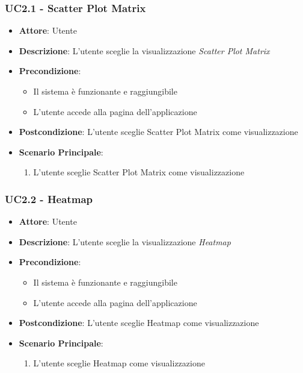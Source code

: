     \subsubsection{UC2.1 - Scatter Plot Matrix}
    \label{uc2.1}
    
    \begin{itemize}
    \item \textbf{Attore}: Utente
    \item \textbf{Descrizione}: L'utente sceglie la visualizzazione \emph{Scatter Plot Matrix}
    \item \textbf{Precondizione}:
    \begin{itemize}
        \item Il sistema è funzionante e raggiungibile
        \item L'utente accede alla pagina dell'applicazione
    \end{itemize}
    \item \textbf{Postcondizione}: L'utente sceglie Scatter Plot Matrix come visualizzazione
    \item \textbf{Scenario Principale}: 
        \begin{enumerate}
            \item L'utente sceglie Scatter Plot Matrix come visualizzazione
        \end{enumerate}
    \end{itemize}
    
    \subsubsection{UC2.2 - Heatmap}
    \label{uc2.2}
    
    \begin{itemize}
    \item \textbf{Attore}: Utente
    \item \textbf{Descrizione}: L'utente sceglie la visualizzazione \emph{Heatmap}
    \item \textbf{Precondizione}:
    \begin{itemize}
        \item Il sistema è funzionante e raggiungibile
        \item L'utente accede alla pagina dell'applicazione
    \end{itemize}
    \item \textbf{Postcondizione}: L'utente sceglie Heatmap come visualizzazione
    \item \textbf{Scenario Principale}: 
        \begin{enumerate}
            \item L'utente sceglie Heatmap come visualizzazione
        \end{enumerate}
    \end{itemize}
    
